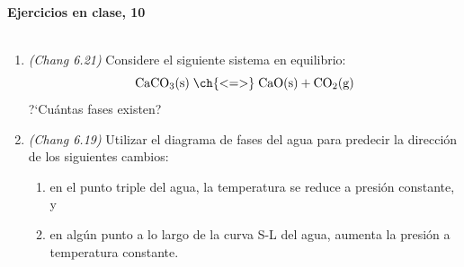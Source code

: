 \documentclass[a4paper,12pt]{article}
\begin{document}

\begin{center}
\HRule \\[0.4cm]
{ \bfseries Ejercicios en clase, 10}\\ %
\HRule \\[0.4cm]
\end{center}


\begin{enumerate}

 \item \textit{(Chang 6.21)} Considere el siguiente sistema en equilibrio:
$$\mbox{CaCO}_3\mbox{(s)}\;\ch{ <=> }\;\mbox{CaO(s)}+\mbox{CO}_2\mbox{(g)}$$
?`Cu\'antas fases existen? %

 \item \textit{(Chang 6.19)} Utilizar el diagrama de fases del agua para predecir la direcci\'on de los siguientes cambios:
 \begin{enumerate}
  \item en el punto triple del agua, la temperatura se reduce a presi\'on constante, y
  \item en alg\'un punto a lo largo de la curva S-L del agua, aumenta la presi\'on a temperatura constante.
 \end{enumerate} %


\end{enumerate}
\end{document}

